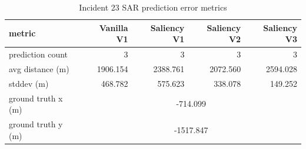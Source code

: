 \begin{table}[ht]
\centering
\caption{Incident 23 SAR prediction error metrics}
\label{tab:sar-incident-23}
\begin{tabular}{lrrrr}
\hline
metric & Vanilla V1 & Saliency V1 & Saliency V2 & Saliency V3 \\
\hline
prediction count & 3 & 3 & 3 & 3 \\
avg distance (m) & 1906.154 & 2388.761 & 2072.560 & 2594.028 \\
stddev (m) & 468.782 & 575.623 & 338.078 & 149.252 \\
ground truth x (m) & \multicolumn{4}{c}{-714.099} \\
ground truth y (m) & \multicolumn{4}{c}{-1517.847} \\
\hline
\end{tabular}
\end{table}
